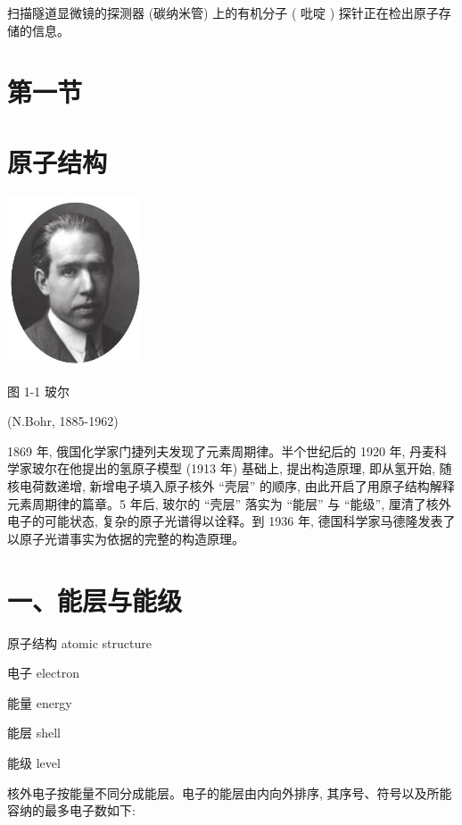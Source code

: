 \documentclass[10pt]{article}
\begin{document}
扫描隧道显微镜的探测器 (碳纳米管) 上的有机分子 ( 吡啶 ) 探针正在检出原子存储的信息。

\section*{第一节}

\section*{原子结构}

\begin{center}
\includegraphics[max width=0.3\textwidth]{images/0190e026-5a11-7df7-bd27-54d09026ba7a_9_102318.jpg}
\end{center}

图 1-1 玻尔

(N.Bohr, 1885-1962)

1869 年, 俄国化学家门捷列夫发现了元素周期律。半个世纪后的 1920 年, 丹麦科学家玻尔在他提出的氢原子模型 (1913 年) 基础上, 提出构造原理, 即从氢开始, 随核电荷数递增, 新增电子填入原子核外 “壳层” 的顺序, 由此开启了用原子结构解释元素周期律的篇章。5 年后, 玻尔的 “壳层” 落实为 “能层” 与 “能级”, 厘清了核外电子的可能状态, 复杂的原子光谱得以诠释。到 1936 年, 德国科学家马德隆发表了以原子光谱事实为依据的完整的构造原理。

\section*{一、能层与能级}

\begin{mdframed}

原子结构 atomic structure

电子 electron

能量 energy

能层 shell

能级 level

\end{mdframed}

核外电子按能量不同分成能层。电子的能层由内向外排序, 其序号、符号以及所能容纳的最多电子数如下:
\end{document}
